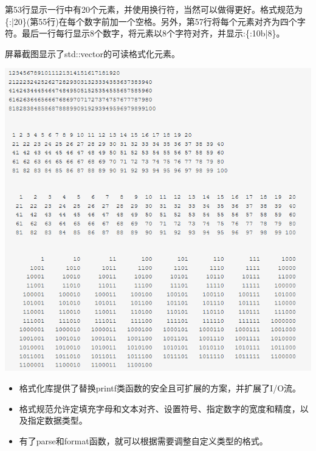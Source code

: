第53行显示一行中有20个元素，并使用换行符，当然可以做得更好。格式规范为\{:|20\}(第55行)在每个数字前加一个空格。另外，第57行将每个元素对齐为四个字符。最后一行每行显示8个数字，将元素以8个字符对齐，并显示:\{:10b|8\}。

屏幕截图显示了std::vector的可读格式化元素。

\begin{center}
\includegraphics[width=1.0\textwidth]{content/3/chapter5/images/31.png}\\
\end{center}

\begin{tcolorbox}[breakable,enhanced jigsaw,colback=mygreen!5!white,colframe=mygreen!75!black,title={总结}]
	
\begin{itemize}
\item 
格式化库提供了替换printf类函数的安全且可扩展的方案，并扩展了I/O流。

\item 
格式规范允许定填充字母和文本对齐、设置符号、指定数字的宽度和精度，以及指定数据类型。

\item 
有了parse和format函数，就可以根据需要调整自定义类型的格式。
\end{itemize}
	
\end{tcolorbox}

\newpage




